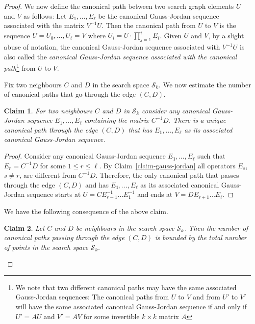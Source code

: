 \documentclass{sig-alternate-2013}
\newtheorem{claim}{Claim}[theorem]
\begin{document}
\begin{proof}
   We now define the canonical path between two search graph elements
   $U$ and $V$ as follows: Let $E_1,\ldots,E_\ell$ be the canonical
   Gauss-Jordan sequence associated with the matrix $V^{-1} U$. Then
   the canonical path from $U$ to $V$ is the sequence $U=
   U_0,\ldots,U_\ell = V$ where $U_i = U \cdot \prod_{j=1}^i
   E_i$. Given $U$ and $V$, by a slight abuse of notation, the
   canonical Gauss-Jordan sequence associated with $V^{-1}U$ is also
   called the \emph{canonical Gauss-Jordan sequence associated with
     the canonical path}\footnote{We note that two different canonical
     paths may have the same associated Gauss-Jordan sequences: The
     canonical paths from $U$ to $V$ and from $U'$ to $V'$ will have
     the same associated canonical Gauss-Jordan sequence if and only
     if $U' = A U$ and $V' = A V$ for some invertible $k\times k$
     matrix $A$} from $U$ to $V$.

  Fix two neighbours $C$ and $D$ in the search space $\mathcal{S}_k$.
  We now estimate the number of canonical paths that go through the
  edge $(C,D)$.

  \begin{claim}\label{claim2}
    For two neighbours $C$ and $D$ in $\mathcal{S}_k$ consider any
    canonical Gauss-Jordan sequence $E_1,\ldots,E_\ell$ containing the
    matrix $C^{-1}D$. There is a unique canonical path through the
    edge $(C,D)$ that has $E_1,\ldots,E_\ell$ as its associated
    canonical Gauss-Jordan sequence.
  \end{claim}
  \begin{proof}
    Consider any canonical Gauss-Jordan sequence $E_1,\ldots,E_\ell$
    such that $E_r = C^{-1}D$ for some $1 \leq r \leq \ell$. By
    Claim~\ref{claim-gauss-jordan} all operators $E_s$, $s \neq r$,
    are different from $C^{-1}D$. Therefore, the only canonical path
    that passes through the edge $(C,D)$ and has $E_1,\ldots,E_\ell$
    as its associated canonical Gauss-Jordan sequence starts at $U =
    CE_{r-1}^{-1}\ldots E_1^{-1}$ and ends at $V = DE_{r+1}\ldots
    E_\ell$.
  \end{proof}

  We have the following consequence of the above claim.

  \begin{claim}\label{claim-bound-canonical}
    Let $C$ and $D$ be neighbours in the search space
    $\mathcal{S}_k$. Then the number of canonical paths passing
    through the edge $(C,D)$ is bounded by the total number of points
    in the search space $\mathcal{S}_k$.
  \end{claim}
  

\end{proof}
\end{document}
